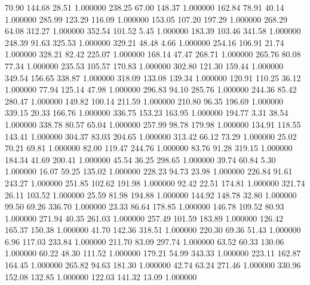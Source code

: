      70.90    144.68     28.51  1.000000
    238.25     67.00    148.37  1.000000
    162.84     78.91     40.14  1.000000
    285.99    123.29    116.09  1.000000
    153.05    107.20    197.29  1.000000
    268.29     64.08    312.27  1.000000
    352.54    101.52      5.45  1.000000
    183.39    103.46    341.58  1.000000
    248.39     91.63    325.53  1.000000
    329.21     48.48      4.66  1.000000
    254.16    106.91     21.74  1.000000
    328.21     82.42    225.07  1.000000
    168.14     47.47    268.71  1.000000
    265.76     80.08     77.34  1.000000
    235.53    105.57    170.83  1.000000
    302.80    121.30    159.44  1.000000
    349.54    156.65    338.87  1.000000
    318.09    133.08    139.34  1.000000
    120.91    110.25     36.12  1.000000
     77.94    125.14     47.98  1.000000
    296.83     94.10    285.76  1.000000
    244.36     85.42    280.47  1.000000
    149.82    100.14    211.59  1.000000
    210.80     96.35    196.69  1.000000
    339.15     20.33    166.76  1.000000
    336.75    153.23    163.95  1.000000
    194.77      3.31     38.54  1.000000
    338.78     80.57     65.04  1.000000
    257.99     98.78    179.98  1.000000
    134.91    118.55    143.41  1.000000
    304.37     83.03    204.65  1.000000
    313.42     66.12     73.29  1.000000
     25.02     70.21     69.81  1.000000
     82.00    119.47    244.76  1.000000
     83.76     91.28    319.15  1.000000
    184.34     41.69    200.41  1.000000
     45.54     36.25    298.65  1.000000
     39.74     60.84      5.30  1.000000
     16.07     59.25    135.02  1.000000
    228.23     94.73     23.98  1.000000
    226.84     91.61    243.27  1.000000
    251.85    102.62    191.98  1.000000
     92.42     22.51    174.81  1.000000
    321.74     26.11    103.52  1.000000
     25.59     81.98    194.88  1.000000
    144.92    148.78     32.80  1.000000
     99.50     69.26    336.70  1.000000
     23.33     86.64    178.85  1.000000
    146.78    109.52     80.93  1.000000
    271.94     40.35    261.03  1.000000
    257.49    101.59    183.89  1.000000
    126.42    165.37    150.38  1.000000
     41.70    142.36    318.51  1.000000
    220.30     69.36     51.43  1.000000
      6.96    117.03    233.84  1.000000
    211.70     83.09    297.74  1.000000
     63.52     60.33    130.06  1.000000
     60.22     48.30    111.52  1.000000
    179.21     54.99    343.33  1.000000
    223.11    162.87    164.45  1.000000
    265.82     94.63    181.30  1.000000
     42.74     63.24    271.46  1.000000
    330.96    152.08    132.85  1.000000
    122.03    141.32     13.09  1.000000
